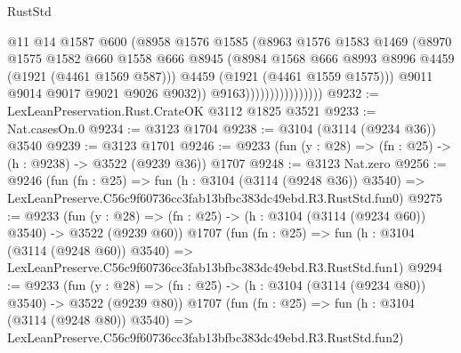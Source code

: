 \begin{lexlean}{RustStd}
\begin{coremodule}
                                    @11
                                    @14
                                    @1587
                                    @600
                                    (@8958
                                      @1576
                                      @1585
                                      (@8963
                                        @1576
                                        @1583
                                        @1469
                                        (@8970
                                          @1575
                                          @1582
                                          @660
                                          @1558
                                          @666
                                          @8945
                                          (@8984
                                            @1568
                                            @666
                                            @8993
                                            @8996
                                            @4459
                                            (@1921 (@4461 @1569 @587)))
                                          @4459
                                          (@1921 (@4461 @1559 @1575)))
                                        @9011
                                        @9014
                                        @9017
                                        @9021
                                        @9026
                                        @9032))
                                    @9163))))))))))))))))
@9232 := LexLeanPreservation.Rust.CrateOK @3112 @1825 @3521
@9233 := Nat.casesOn.{0}
@9234 := @3123 @1704
@9238 := @3104 (@3114 (@9234 @36)) @3540
@9239 := @3123 @1701
@9246 := @9233 (fun (y : @28) => (fn : @25) -> (h : @9238) -> @3522 (@9239 @36)) @1707
@9248 := @3123 Nat.zero
@9256 := @9246
    (fun (fn : @25) =>
    fun (h : @3104 (@3114 (@9248 @36)) @3540) =>
    LexLeanPreserve.C56c9f60736cc3fab13bfbc383dc49ebd.R3.RustStd.fun0)
@9275 := @9233
    (fun (y : @28) => (fn : @25) -> (h : @3104 (@3114 (@9234 @60)) @3540) -> @3522 (@9239 @60))
    @1707
    (fun (fn : @25) =>
    fun (h : @3104 (@3114 (@9248 @60)) @3540) =>
    LexLeanPreserve.C56c9f60736cc3fab13bfbc383dc49ebd.R3.RustStd.fun1)
@9294 := @9233
    (fun (y : @28) => (fn : @25) -> (h : @3104 (@3114 (@9234 @80)) @3540) -> @3522 (@9239 @80))
    @1707
    (fun (fn : @25) =>
    fun (h : @3104 (@3114 (@9248 @80)) @3540) =>
    LexLeanPreserve.C56c9f60736cc3fab13bfbc383dc49ebd.R3.RustStd.fun2)

\end{coremodule}
\end{lexlean}
